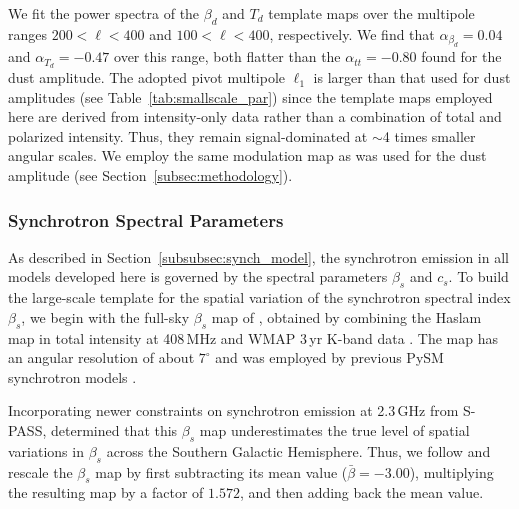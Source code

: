 \documentclass[twocolumn]{aastex631}
\begin{document}
We fit the power spectra of the $\beta_d$ and $T_d$ template maps over the multipole ranges $200 < \ell < 400$ and $100 < \ell < 400$, respectively. We find that $\alpha_{\beta_d}= 0.04$ and $\alpha_{T_d} = -0.47$ over this range, both flatter than the $\alpha_{tt} = -0.80$ found for the dust amplitude. The adopted pivot multipole $\ell_1$ is larger than that used for dust amplitudes (see Table~\ref{tab:smallscale_par}) since the template maps employed here are derived from intensity-only data rather than a combination of total and polarized intensity. Thus, they remain signal-dominated at $\sim$4 times smaller angular scales. We employ the same modulation map as was used for the dust amplitude (see Section~\ref{subsec:methodology}).


\subsubsection{Synchrotron Spectral Parameters}\label{sec:beta_s}
As described in Section~\ref{subsubsec:synch_model}, the synchrotron emission in all models developed here is governed by the spectral parameters $\beta_s$ and $c_s$. To build the large-scale template for the spatial variation of the synchrotron spectral index $\beta_s$, we begin with the full-sky $\beta_s$ map of \citet{Miville-Deschenes:2008}, obtained by combining the Haslam map in total intensity at 408\,MHz \citep{Remazeilles:2015} and WMAP 3\,yr K-band data \citep{Hinshaw:2007}. The map has an angular resolution of about $7^{\circ}$ and was employed by previous PySM synchrotron models \citep{Thorne:2017}.

Incorporating newer constraints on synchrotron emission at 2.3\,GHz from S-PASS, \citet{Krachmalnicoff:2018} determined that this $\beta_s$ map underestimates the true level of spatial variations in $\beta_s$ across the Southern Galactic Hemisphere. Thus, we follow \citet{Krachmalnicoff:2018} and rescale the $\beta_s$ map by first subtracting its mean value ($\bar{\beta} = -3.00$), multiplying the resulting map by a factor of $1.572$, and then adding back the mean value.
\end{document}
